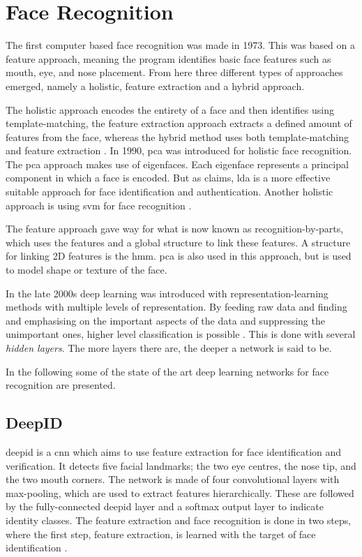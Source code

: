 \section{Face Recognition}
The first computer based face recognition was made in 1973. This was based on a feature approach, meaning the program identifies basic face features such as mouth, eye, and nose placement. 
From here three different types of approaches emerged, namely a holistic, feature extraction and a hybrid approach. 

The holistic approach encodes the entirety of a face and then identifies using template-matching, the feature extraction approach extracts a defined amount of features from the face, whereas the hybrid method uses both template-matching and feature extraction \citep{Wechsler2007}.
In 1990, \gls{pca} was introduced for holistic face recognition. The \gls{pca} approach makes use of eigenfaces. Each eigenface represents a principal component in which a face is encoded. But as \cite{Wechsler2007} claims, \gls{lda} is a more effective suitable approach for face identification and authentication. Another holistic approach is using \gls{svm} for face recognition \citep{Wechsler2007}.

The feature approach gave way for what is now known as recognition-by-parts, which uses the features and a global structure to link these features. A structure for linking 2D features is the \gls{hmm}. \gls{pca} is also used in this approach, but is used to model shape or texture of the face.

In the late 2000s deep learning was introduced with representation-learning methods with multiple levels of representation. By feeding raw data and finding and emphasising on the important aspects of the data and suppressing the unimportant ones, higher level classification is possible \citep{LeCun2015}. This is done with several \textit{hidden layers}. The more layers there are, the deeper a network is said to be. 

In the following some of the state of the art deep learning networks for face recognition are presented.

\subsection{DeepID}
\gls{deepid} is a \gls{cnn} which aims to use feature extraction for face identification and verification. It detects five facial landmarks; the two eye centres, the nose tip, and the two mouth corners. The network is made of four convolutional layers with max-pooling, which are used to extract features hierarchically. These are followed by the fully-connected \gls{deepid} layer and a softmax output layer to indicate identity classes. The feature extraction and face recognition is done in two steps, where the first step, feature extraction, is learned with the target of face identification \citep{deepID2014}.

